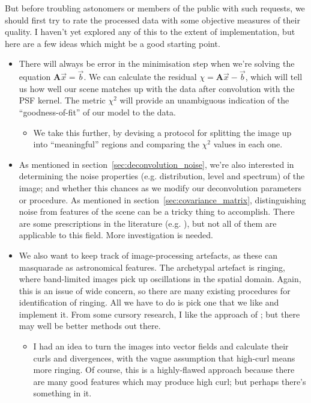 \documentclass[letterpaper, 11pt]{article}
\begin{document}
But before troubling astonomers or members of the public with such requests, we should first try to rate the processed data with some objective measures of their quality. I haven't yet explored any of this to the extent of implementation, but here are a few ideas which might be a good starting point.
\begin{itemize}
	\item There will always be error in the minimisation step when we're solving the equation $\mathbf A \vec x = \vec b$. We can calculate the residual $\chi = \mathbf A \vec x - \vec b$, which will tell us how well our scene matches up with the data after convolution with the PSF kernel. The metric $\chi^2$ will provide an unambiguous indication of the ``goodness-of-fit'' of our model to the data.
	\begin{itemize}
		\item We take this further, by devising a protocol for splitting the image up into ``meaningful'' regions and comparing the $\chi^2$ values in each one.
	\end{itemize}
	
	\item As mentioned in section~\ref{sec:deconvolution_noise}, we're also interested in determining the noise properties (e.g. distribution, level and spectrum) of the image; and whether this chances as we modify our deconvolution parameters or procedure. As mentioned in section~\ref{sec:covariance_matrix}, distinguishing noise from features of the scene can be a tricky thing to accomplish. There are some prescriptions in the literature (e.g. \citet{L+M08, Moi07}), but not all of them are applicable to this field. More investigation is needed.
	
	\item We also want to keep track of image-processing artefacts, as these can masquarade as astronomical features. The archetypal artefact is ringing, where band-limited images pick up oscillations in the spatial domain. Again, this is an issue of wide concern, so there are many existing procedures for identification of ringing. All we have to do is pick one that we like and implement it. From some cursory research, I like the approach of \citet{BMR10}; but there may well be better methods out there.
	\begin{itemize}
		\item I had an idea to turn the images into vector fields and calculate their curls and divergences, with the vague assumption that high-curl means more ringing. Of course, this is a highly-flawed approach because there are many good features which may produce high curl; but perhaps there's something in it.
	\end{itemize}
	

\end{itemize}
\end{document}
